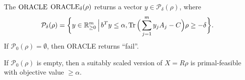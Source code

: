 \documentclass{beamer}
\begin{document}
\frame{\titlepage}










\appendix
\nocite{*}
\frame[allowframebreaks]{\printbibliography}

\begin{frame}{The $\operatorname{ORACLE}$}
  $\operatorname{ORACLE}_\delta(\rho)$ returns a vector $y\in\mathcal{P}_\delta(\rho)$, where
 \begin{equation*}
  \mathcal{P}_\delta(\rho) = \bigg\{ y\in\mathbb{R}^m_{\geq 0} \, \Big| \, b^T y \leq \alpha, \operatorname{Tr}\Big(\sum_{j=1}^m y_j A_j - C \Big)\rho  \geq -\delta \bigg\}.
 \end{equation*}
 If $\mathcal{P}_0(\rho)=\emptyset$, then ORACLE returns ``fail''.
 
 \vspace{2\floatsep}
 
 \begin{lemma}
  If $\mathcal{P}_0(\rho)$ is empty, then a suitably scaled version of $X=R\rho$ is primal-feasible with objective value $\geq \alpha$.
 \end{lemma}

 \vspace{\floatsep}
 
 

\end{frame}
\end{document}
